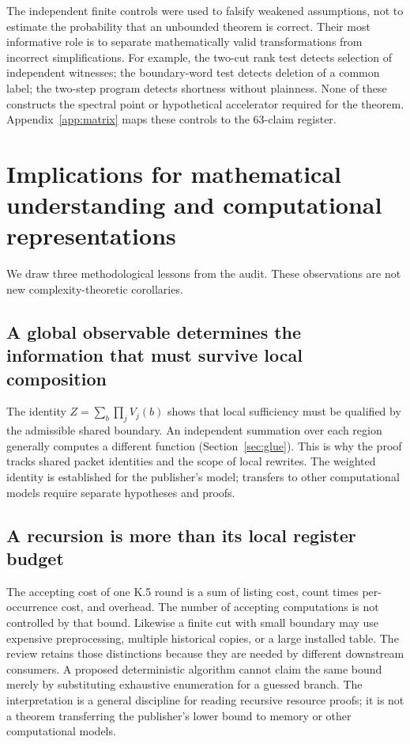 \documentclass[11pt,letterpaper]{article}
\theoremstyle{definition}\newtheorem{definition}[theorem]{Definition}\newtheorem{example}[theorem]{Example}
\theoremstyle{remark}\newtheorem{remark}[theorem]{Remark}
\begin{document}
The independent finite controls were used to falsify weakened assumptions, not to estimate the probability that an unbounded theorem is correct. Their most informative role is to separate mathematically valid transformations from incorrect simplifications. For example, the two-cut rank test detects selection of independent witnesses; the boundary-word test detects deletion of a common label; the two-step program detects shortness without plainness. None of these constructs the spectral point or hypothetical accelerator required for the theorem. Appendix~\ref{app:matrix} maps these controls to the 63-claim register.

\section{Implications for mathematical understanding and computational representations}\label{sec:implications}
We draw three methodological lessons from the audit. These observations are not new complexity-theoretic corollaries.

\subsection{A global observable determines the information that must survive local composition}
The identity $Z=\sum_b\prod_jV_j(b)$ shows that local sufficiency must be qualified by the admissible shared boundary. An independent summation over each region generally computes a different function (Section~\ref{sec:glue}). This is why the proof tracks shared packet identities and the scope of local rewrites. The weighted identity is established for the publisher's model; transfers to other computational models require separate hypotheses and proofs.

\subsection{A recursion is more than its local register budget}
The accepting cost of one K.5 round is a sum of listing cost, count times per-occurrence cost, and overhead. The number of accepting computations is not controlled by that bound. Likewise a finite cut with small boundary may use expensive preprocessing, multiple historical copies, or a large installed table. The review retains those distinctions because they are needed by different downstream consumers. A proposed deterministic algorithm cannot claim the same bound merely by substituting exhaustive enumeration for a guessed branch. The interpretation is a general discipline for reading recursive resource proofs; it is not a theorem transferring the publisher's lower bound to memory or other computational models.
\end{document}
